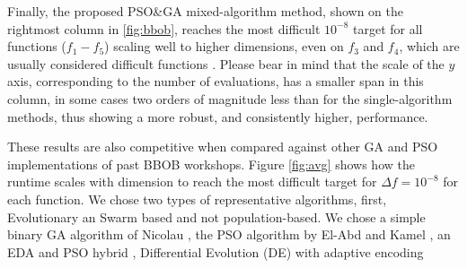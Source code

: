 \documentclass[runningheads]{llncs}
\begin{document}
%
Finally, the proposed PSO\&GA mixed-algorithm method, shown on the
rightmost column in \autoref{fig:bbob}, reaches the most difficult $10^{-8}$ target
for all functions ($f_1-f_5$) scaling well to higher dimensions, even
on $f_3$ and $f_4$, which are usually
considered difficult functions \cite{hansen2010comparing}. Please bear
in mind that the scale of the $y$ axis, corresponding to the number of
evaluations, has a smaller span in this column, in some cases two
orders of magnitude less than for the single-algorithm methods, thus
showing a more robust, and consistently higher, performance.


These results are also competitive when compared against other GA and PSO
implementations of past BBOB workshops. Figure \ref{fig:avg} shows
how the runtime scales with dimension to reach the most difficult target
for $\Delta f = 10^{-8}$ for each function.
We chose two types of representative algorithms, first, Evolutionary 
an Swarm based and  not population-based. We chose a simple binary GA algorithm of Nicolau \cite{nicolau2009application},
the PSO algorithm by El-Abd and Kamel \cite{el2009blackHybrid}, an EDA and PSO
hybrid \cite{el2009blackHybrid}, 
Differential Evolution (DE) with adaptive encoding \cite{povsik2012benchmarking}
\end{document}
